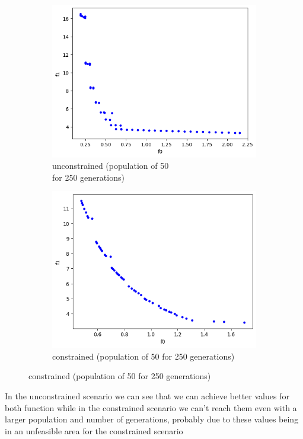 \begin{figure}[H]
    \centering
    \begin{subfigure}[t]{0.5\textwidth}
        \centering
        \includegraphics[width=\linewidth]{images/lab5/pfront_unconstrained_high.png}
        \caption{unconstrained (population of 50 \\ for 250 generations)}
    \end{subfigure}%
    \begin{subfigure}[t]{0.5\textwidth}
        \centering
        \includegraphics[width=\linewidth]{images/lab5/pfront_constrained_high.png}
        \caption{constrained (population of 50 for 250 generations)}
    \end{subfigure}
\end{figure}
In the unconstrained scenario we can see that we can achieve better values for both function while in the constrained scenario we can't reach them even with a larger population and number of generations, probably due to these values being in an unfeasible area for the constrained scenario 

